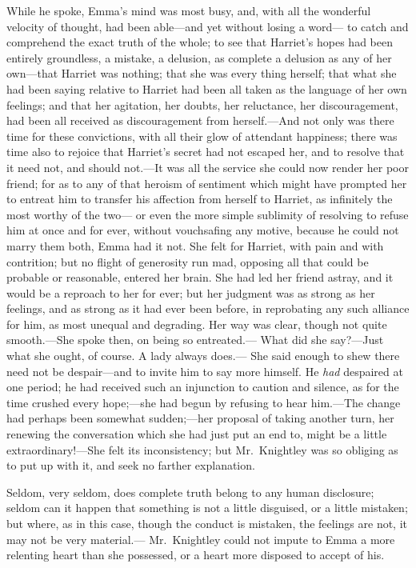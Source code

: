 While he spoke, Emma's mind was most busy, and, with all the wonderful
velocity of thought, had been able---and yet without losing a word---%
to catch and comprehend the exact truth of the whole; to see that
Harriet's hopes had been entirely groundless, a mistake, a delusion,
as complete a delusion as any of her own---that Harriet was nothing;
that she was every thing herself; that what she had been saying
relative to Harriet had been all taken as the language of her
own feelings; and that her agitation, her doubts, her reluctance,
her discouragement, had been all received as discouragement
from herself.---And not only was there time for these convictions,
with all their glow of attendant happiness; there was time also to
rejoice that Harriet's secret had not escaped her, and to resolve
that it need not, and should not.---It was all the service she could
now render her poor friend; for as to any of that heroism of sentiment
which might have prompted her to entreat him to transfer his affection
from herself to Harriet, as infinitely the most worthy of the two---%
or even the more simple sublimity of resolving to refuse him
at once and for ever, without vouchsafing any motive, because he
could not marry them both, Emma had it not.  She felt for Harriet,
with pain and with contrition; but no flight of generosity run mad,
opposing all that could be probable or reasonable, entered her brain.
She had led her friend astray, and it would be a reproach to
her for ever; but her judgment was as strong as her feelings,
and as strong as it had ever been before, in reprobating any such
alliance for him, as most unequal and degrading.  Her way was clear,
though not quite smooth.---She spoke then, on being so entreated.---%
What did she say?---Just what she ought, of course.  A lady always does.---%
She said enough to shew there need not be despair---and to invite him
to say more himself.  He \emph{had} despaired at one period; he had received
such an injunction to caution and silence, as for the time crushed
every hope;---she had begun by refusing to hear him.---The change had
perhaps been somewhat sudden;---her proposal of taking another turn,
her renewing the conversation which she had just put an end to,
might be a little extraordinary!---She felt its inconsistency;
but Mr.\ Knightley was so obliging as to put up with it, and seek no
farther explanation.

Seldom, very seldom, does complete truth belong to any human disclosure;
seldom can it happen that something is not a little disguised,
or a little mistaken; but where, as in this case, though the conduct
is mistaken, the feelings are not, it may not be very material.---%
Mr.\ Knightley could not impute to Emma a more relenting heart than
she possessed, or a heart more disposed to accept of his.

